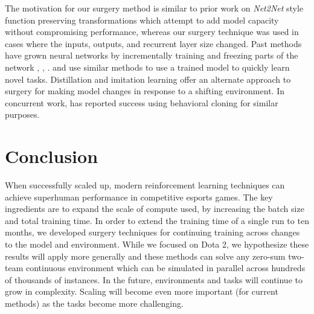 \documentclass[11pt]{article}
\newcommand\todo[1]{\textcolor{red}{TODO: #1}}
\newcommand{\dota}{Dota 2\xspace}
\begin{document}
The motivation for our surgery method is similar to prior work on {\it Net2Net} style function preserving transformations \cite{chen15net2net} which attempt to add model capacity without compromising performance, whereas our surgery technique was used in cases where the inputs, outputs, and recurrent layer size changed.
Past methods have grown neural networks by incrementally training and freezing parts of the network \cite{fahlman90cascade}, \cite{wang17growing}, \cite{DBLP:journals/corr/abs-1806-01780}.
\citet{li18learningwithoutforgetting} and \citet{rusu16progressive} use similar methods to use a trained model to quickly learn novel tasks.
Distillation \cite{hinton15distilling} and imitation learning \cite{ross11dagger, levine13gps} offer an alternate approach to surgery for making model changes in response to a shifting environment. In concurrent work, \citet{unpublishedrobotics} has reported success using behavioral cloning for similar purposes.

\section{Conclusion}
When successfully scaled up, modern reinforcement learning techniques can achieve superhuman performance in competitive esports games.
The key ingredients are to expand the scale of compute used, by increasing the batch size and total training time.
In order to extend the training time of a single run to ten months, we developed surgery techniques for continuing training across changes to the model and environment.
While we focused on \dota, we hypothesize these results will apply more generally and these methods can solve any zero-sum two-team continuous environment which can be simulated in parallel across hundreds of thousands of instances.
In the future, environments and tasks will continue to grow in complexity. 
Scaling will become even more important (for current methods) as the tasks become more challenging.

\newpage
\end{document}
